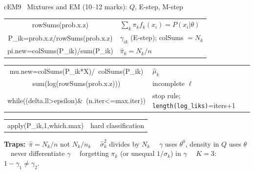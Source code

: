 \documentclass{article}
\newcommand{\trap}{{\color{cBay}\textbf{Traps:}}\ }
\newcommand{\rc}[1]{\texttt{#1}}
\newcommand{\sep}{\ \textbullet\ }
\begin{document}
\begin{multicols*}{3}
\begin{tb}{cEM}{9 \textbullet\ Mixtures and EM (10--12 marks): $Q$, E-step, M-step}
\begin{tabularx}{\linewidth}{@{}C{0.47}|L@{}}
rowSums(prob.x.z) & $\sum_k\pi_kf_k(x_i)=P(x_i|\theta)$\\
P\_ik=prob.x.z/rowSums(prob.x.z) & $\gamma_{ik}$ (E-step); colSums $=N_k$\\
pi.new=colSums(P\_ik)/sum(P\_ik) & $\hat\pi_k=N_k/n$\\
\end{tabularx}\par\nointerlineskip
\begin{tabularx}{\linewidth}{@{}C{0.47}|L@{}}
mu.new=colSums(P\_ik*X)/\newline\ colSums(P\_ik) & $\hat\mu_k$\\
sum(log(rowSums(prob.x.z))) & incomplete $\ell$\\
while((delta.ll>epsilon)\&\newline\ (n.iter<=max.iter)) & stop rule; \rc{length(log\_liks)}=iters+1\\
\end{tabularx}\par\nointerlineskip
\begin{tabularx}{\linewidth}{@{}C{0.47}|L@{}}
apply(P\_ik,1,which.max) & hard classification\\
\end{tabularx}
\trap $\hat\pi=N_k/n$ not $N_k/n_k$ \sep $\hat\sigma^2_k$ divides by $N_k$ \sep $\gamma$ uses $\theta^0$, density in $Q$ uses $\theta$ \sep never differentiate $\gamma$ \sep forgetting $\pi_k$ (or unequal $1/\sigma_k$) in $\gamma$ \sep $K{=}3$: $1-\gamma_1\ne\gamma_2$.
\end{tb}


\end{multicols*}
\end{document}
